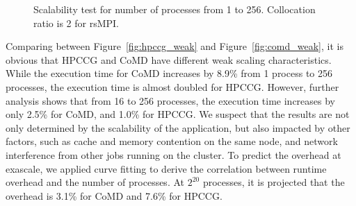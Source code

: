 \begin{figure}[!t]
	\begin{center}
	\end{center}
	\vskip -0.2in
	\caption{Scalability test for number of processes from 1 to 256. Collocation ratio is 2 for rsMPI.}
	\label{fig:scalability}
    \vspace{-0.2in}
\end{figure}

Comparing between Figure~\ref{fig:hpccg_weak} and Figure~\ref{fig:comd_weak}, it is obvious that HPCCG and CoMD have different weak scaling characteristics. While the execution time for CoMD increases by 8.9\% from 1 process to 256 processes, the execution time is almost doubled for HPCCG. However, further analysis shows that from 16 to 256 processes, the execution time increases by only 2.5\% for CoMD, and 1.0\% for HPCCG. We suspect that the results are not only determined by the scalability of the application, but also impacted by other factors, such as cache and memory contention on the same node, and network interference from other jobs running on the cluster. %
To predict the overhead at exascale, we applied curve fitting to derive the correlation between runtime overhead and the number of processes. At $2^{20}$ processes, it is projected that the overhead is 3.1\% for CoMD and 7.6\% for HPCCG. 

